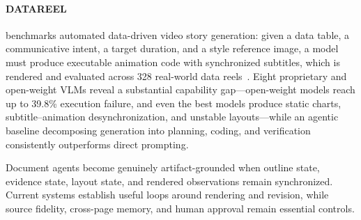  \paragraph{DATAREEL} benchmarks automated data-driven video story generation: given a data table, a communicative intent, a target duration, and a style reference image, a model must produce executable animation code with synchronized subtitles, which is rendered and evaluated across 328 real-world data reels~\cite{avg260425220}. Eight proprietary and open-weight VLMs reveal a substantial capability gap---open-weight models reach up to 39.8\% execution failure, and even the best models produce static charts, subtitle--animation desynchronization, and unstable layouts---while an agentic baseline decomposing generation into planning, coding, and verification consistently outperforms direct prompting.


Document agents become genuinely artifact-grounded when outline state, evidence state, layout state, and rendered observations remain synchronized. Current systems establish useful loops around rendering and revision, while source fidelity, cross-page memory, and human approval remain essential controls.

\FloatBarrier

